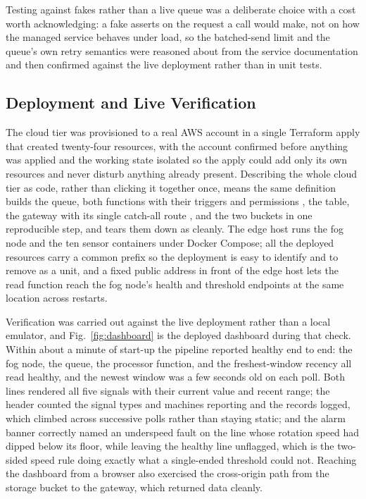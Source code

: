 \documentclass[conference]{IEEEtran}
\begin{document}
Testing against fakes rather than a live queue was a deliberate choice with a cost worth acknowledging: a fake asserts on the request a call would make, not on how the managed service behaves under load, so the batched-send limit and the queue's own retry semantics were reasoned about from the service documentation \cite{awssqs} and then confirmed against the live deployment rather than in unit tests.

\subsection{Deployment and Live Verification}

The cloud tier was provisioned to a real AWS account in a single Terraform apply that created twenty-four resources, with the account confirmed before anything was applied and the working state isolated so the apply could add only its own resources and never disturb anything already present. Describing the whole cloud tier as code, rather than clicking it together once, means the same definition builds the queue, both functions with their triggers and permissions \cite{awslambda}, the table, the gateway with its single catch-all route \cite{awsapigw}, and the two buckets in one reproducible step, and tears them down as cleanly. The edge host runs the fog node and the ten sensor containers under Docker Compose; all the deployed resources carry a common prefix so the deployment is easy to identify and to remove as a unit, and a fixed public address in front of the edge host lets the read function reach the fog node's health and threshold endpoints at the same location across restarts.

Verification was carried out against the live deployment rather than a local emulator, and Fig.~\ref{fig:dashboard} is the deployed dashboard during that check. Within about a minute of start-up the pipeline reported healthy end to end: the fog node, the queue, the processor function, and the freshest-window recency all read healthy, and the newest window was a few seconds old on each poll. Both lines rendered all five signals with their current value and recent range; the header counted the signal types and machines reporting and the records logged, which climbed across successive polls rather than staying static; and the alarm banner correctly named an underspeed fault on the line whose rotation speed had dipped below its floor, while leaving the healthy line unflagged, which is the two-sided speed rule doing exactly what a single-ended threshold could not. Reaching the dashboard from a browser also exercised the cross-origin path from the storage bucket to the gateway, which returned data cleanly.
\end{document}

